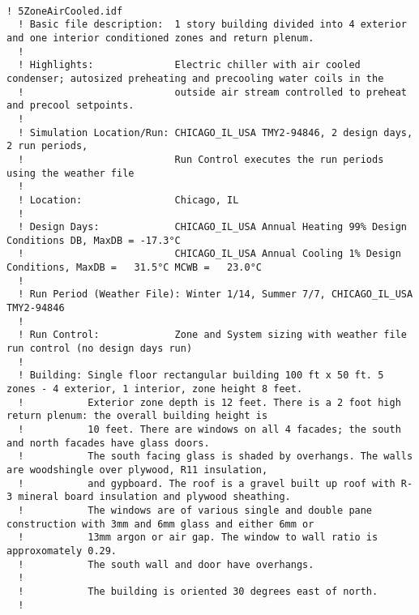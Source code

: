 \begin{lstlisting}

! 5ZoneAirCooled.idf
  ! Basic file description:  1 story building divided into 4 exterior and one interior conditioned zones and return plenum.
  !
  ! Highlights:              Electric chiller with air cooled condenser; autosized preheating and precooling water coils in the
  !                          outside air stream controlled to preheat and precool setpoints.
  !
  ! Simulation Location/Run: CHICAGO_IL_USA TMY2-94846, 2 design days, 2 run periods,
  !                          Run Control executes the run periods using the weather file
  !
  ! Location:                Chicago, IL
  !
  ! Design Days:             CHICAGO_IL_USA Annual Heating 99% Design Conditions DB, MaxDB = -17.3°C
  !                          CHICAGO_IL_USA Annual Cooling 1% Design Conditions, MaxDB =   31.5°C MCWB =   23.0°C
  !
  ! Run Period (Weather File): Winter 1/14, Summer 7/7, CHICAGO_IL_USA TMY2-94846
  !
  ! Run Control:             Zone and System sizing with weather file run control (no design days run)
  !
  ! Building: Single floor rectangular building 100 ft x 50 ft. 5 zones - 4 exterior, 1 interior, zone height 8 feet.
  !           Exterior zone depth is 12 feet. There is a 2 foot high return plenum: the overall building height is
  !           10 feet. There are windows on all 4 facades; the south and north facades have glass doors.
  !           The south facing glass is shaded by overhangs. The walls are woodshingle over plywood, R11 insulation,
  !           and gypboard. The roof is a gravel built up roof with R-3 mineral board insulation and plywood sheathing.
  !           The windows are of various single and double pane construction with 3mm and 6mm glass and either 6mm or
  !           13mm argon or air gap. The window to wall ratio is approxomately 0.29.
  !           The south wall and door have overhangs.
  !
  !           The building is oriented 30 degrees east of north.
  !



\end{lstlisting}

